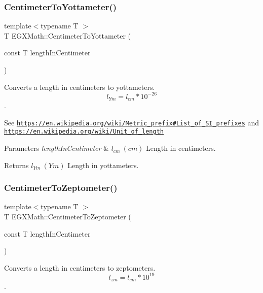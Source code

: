 \subsubsection{\texorpdfstring{Centimeter\+To\+Yottameter()}{CentimeterToYottameter()}}
{\footnotesize\ttfamily template$<$typename T $>$ \\
T E\+G\+X\+Math\+::\+Centimeter\+To\+Yottameter (\begin{DoxyParamCaption}\item[{const T}]{length\+In\+Centimeter }\end{DoxyParamCaption})}



Converts a length in centimeters to yottameters. \[ l_{Ym}=l_{cm} * 10^{-26} \]. 

See \href{https://en.wikipedia.org/wiki/Metric_prefix#List_of_SI_prefixes}{\tt https\+://en.\+wikipedia.\+org/wiki/\+Metric\+\_\+prefix\#\+List\+\_\+of\+\_\+\+S\+I\+\_\+prefixes} and \href{https://en.wikipedia.org/wiki/Unit_of_length}{\tt https\+://en.\+wikipedia.\+org/wiki/\+Unit\+\_\+of\+\_\+length} 
\begin{DoxyParams}{Parameters}
{\em length\+In\+Centimeter} & $ l_{cm}\ (cm)$ Length in centimeters. \\
\hline
\end{DoxyParams}
\begin{DoxyReturn}{Returns}
$ l_{Ym}\ (Ym)$ Length in yottameters. 
\end{DoxyReturn}
\mbox{\label{group___e_g_x_math-_conversions-_length_conversions-_s_i-_centimeter-_s_i_ga1f7a10f9710f514dcc9132d4ce1f0bfa}} 
\subsubsection{\texorpdfstring{Centimeter\+To\+Zeptometer()}{CentimeterToZeptometer()}}
{\footnotesize\ttfamily template$<$typename T $>$ \\
T E\+G\+X\+Math\+::\+Centimeter\+To\+Zeptometer (\begin{DoxyParamCaption}\item[{const T}]{length\+In\+Centimeter }\end{DoxyParamCaption})}



Converts a length in centimeters to zeptometers. \[ l_{zm}=l_{cm} * 10^{19} \]. 

